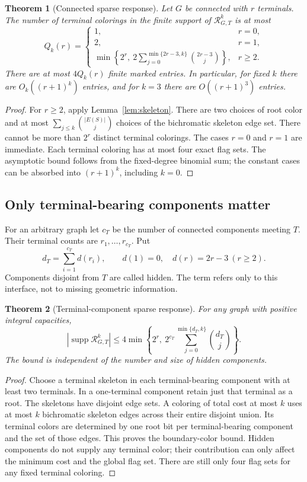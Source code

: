 \documentclass[11pt,a4paper]{article}
\newtheorem{theorem}{Theorem}[section]
\theoremstyle{definition}
\theoremstyle{remark}
\DeclareMathOperator{\supp}{supp}
\newcommand{\Resp}{\mathcal R}
\newcommand{\bk}[2]{\sum_{j=0}^{\min\{#1,#2\}}\binom{#1}{j}}
\begin{document}
\begin{theorem}[Connected sparse response]
\label{thm:sparse}
Let $G$ be connected with $r$ terminals. The number of terminal colorings in the finite support of $\Resp^k_{G,T}$ is at most
\[
 Q_k(r)=
 \begin{cases}
 1,&r=0,\\
 2,&r=1,\\
 \displaystyle\min\left\{2^r,\ 2\bk{2r-3}{k}\right\},&r\ge2.
 \end{cases}
\]
There are at most $4Q_k(r)$ finite marked entries. In particular, for fixed $k$ there are $O_k((r+1)^k)$ entries, and for $k=3$ there are $O((r+1)^3)$ entries.
\end{theorem}
\begin{proof}
For $r\ge2$, apply Lemma~\ref{lem:skeleton}. There are two choices of root color and at most $\sum_{j\le k}\binom{|E(S)|}{j}$ choices of the bichromatic skeleton edge set. There cannot be more than $2^r$ distinct terminal colorings. The cases $r=0$ and $r=1$ are immediate. Each terminal coloring has at most four exact flag sets. The asymptotic bound follows from the fixed-degree binomial sum; the constant cases can be absorbed into $(r+1)^k$, including $k=0$.
\end{proof}

\subsection{Only terminal-bearing components matter}
For an arbitrary graph let $c_T$ be the number of connected components meeting $T$. Their terminal counts are $r_1,\ldots,r_{c_T}$. Put
\[
 d_T=\sum_{i=1}^{c_T}d(r_i),\qquad
 d(1)=0,\quad d(r)=2r-3\ (r\ge2).
\]
Components disjoint from $T$ are called hidden. The term refers only to this interface, not to missing geometric information.

\begin{theorem}[Terminal-component sparse response]
\label{thm:components}
For any graph with positive integral capacities,
\[
 |\supp\Resp_{G,T}^{k}|\le
 4\min\left\{2^r,\ 2^{c_T}\bk{d_T}{k}\right\}.
 \tag{1}\label{eq:components}
\]
The bound is independent of the number and size of hidden components.
\end{theorem}
\begin{proof}
Choose a terminal skeleton in each terminal-bearing component with at least two terminals. In a one-terminal component retain just that terminal as a root. The skeletons have disjoint edge sets. A coloring of total cost at most $k$ uses at most $k$ bichromatic skeleton edges across their entire disjoint union. Its terminal colors are determined by one root bit per terminal-bearing component and the set of those edges. This proves the boundary-color bound. Hidden components do not supply any terminal color; their contribution can only affect the minimum cost and the global flag set. There are still only four flag sets for any fixed terminal coloring.
\end{proof}
\end{document}

